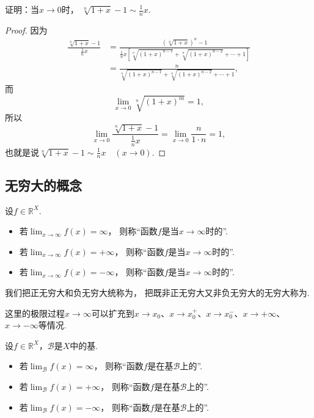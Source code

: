 \begin{example}
证明：当\(x\to0\)时，
\(\sqrt[n]{1+x} - 1 \sim \frac1n x\).
\begin{proof}
因为\begin{align*}
	\frac{\sqrt[n]{1+x} - 1}{\frac1n x}
	&= \frac{(\sqrt[n]{1+x})^n - 1}{\frac1n x \left[ \sqrt[n]{(1+x)^{n-1}} + \sqrt[n]{(1+x)^{n-2}} + \dotsb + 1 \right]} \\
	&= \frac{n}{\sqrt[n]{(1+x)^{n-1}} + \sqrt[n]{(1+x)^{n-2}} + \dotsb + 1},
\end{align*}
而\[
	\lim_{x\to0} \sqrt[n]{(1+x)^m} = 1,
\]
所以\[
	\lim_{x\to0} \frac{\sqrt[n]{1+x} - 1}{\frac1n x} = \lim_{x\to0} \frac{n}{1 \cdot n} = 1,
\]
也就是说\(\sqrt[n]{1+x} - 1 \sim \frac1n x \quad(x\to0)\).
\end{proof}
\end{example}

\subsection{无穷大的概念}
\begin{definition}
设\(f\in\mathbb{R}^X\).
\begin{itemize}
	\item 若\(\lim_{x\to\infty} f(x) = \infty\)，
	则称“函数\(f\)是当\(x\to\infty\)时的”.

	\item 若\(\lim_{x\to\infty} f(x) = +\infty\)，
	则称“函数\(f\)是当\(x\to\infty\)时的”.

	\item 若\(\lim_{x\to\infty} f(x) = -\infty\)，
	则称“函数\(f\)是当\(x\to\infty\)时的”.
\end{itemize}
我们把正无穷大和负无穷大统称为，
把既非正无穷大又非负无穷大的无穷大称为.
\end{definition}
这里的极限过程\(x \to \infty\)可以扩充到\(x \to x_0\)、\(x \to x_0^+\)、\(x \to x_0^-\)、\(x \to +\infty\)、\(x \to -\infty\)等情况.

\begin{definition}
设\(f\in\mathbb{R}^X\)，\(\mathcal{B}\)是\(X\)中的基.
\begin{itemize}
	\item 若\(\lim_\mathcal{B} f(x) = \infty\)，
	则称“函数\(f\)是在基\(\mathcal{B}\)上的”.

	\item 若\(\lim_\mathcal{B} f(x) = +\infty\)，
	则称“函数\(f\)是在基\(\mathcal{B}\)上的”.

	\item 若\(\lim_\mathcal{B} f(x) = -\infty\)，
	则称“函数\(f\)是在基\(\mathcal{B}\)上的”.
\end{itemize}
\end{definition}

